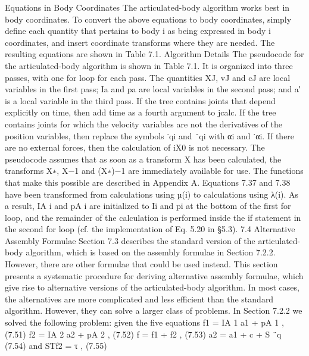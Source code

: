 Equations in Body Coordinates The articulated-body algorithm works best in body coordinates. To convert the above equations to body coordinates, simply define each quantity that pertains to body i as being expressed in body i coordinates, and insert coordinate transforms where they are needed. The resulting equations are shown in Table 7.1. Algorithm Details The pseudocode for the articulated-body algorithm is shown in Table 7.1. It is organized into three passes, with one for loop for each pass. The quantities XJ, vJ and cJ are local variables in the first pass; Ia and pa are local variables in the second pass; and a′ is a local variable in the third pass. If the tree contains joints that depend explicitly on time, then add time as a fourth argument to jcalc. If the tree contains joints for which the velocity variables are not the derivatives of the position variables, then replace the symbols ˙qi and ¨qi with αi and ˙αi. If there are no external forces, then the calculation of iX0 is not necessary. The pseudocode assumes that as soon as a transform X has been calculated, the transforms X∗, X−1 and (X∗)−1 are immediately available for use. The functions that make this possible are described in Appendix A. Equations 7.37 and 7.38 have been transformed from calculations using µ(i) to calculations using λ(i). As a result, IA i and pA i are initialized to Ii and pi at the bottom of the first for loop, and the remainder of the calculation is performed inside the if statement in the second for loop (cf. the implementation of Eq. 5.20 in §5.3). 7.4 Alternative Assembly Formulae Section 7.3 describes the standard version of the articulated-body algorithm, which is based on the assembly formulae in Section 7.2.2. However, there are other formulae that could be used instead. This section presents a systematic procedure for deriving alternative assembly formulae, which give rise to alternative versions of the articulated-body algorithm. In most cases, the alternatives are more complicated and less efficient than the standard algorithm. However, they can solve a larger class of problems. In Section 7.2.2 we solved the following problem: given the five equations f1 = IA 1 a1 + pA 1 , (7.51) f2 = IA 2 a2 + pA 2 , (7.52) f = f1 + f2 , (7.53) a2 = a1 + c + S ¨q (7.54) and STf2 = τ , (7.55)

